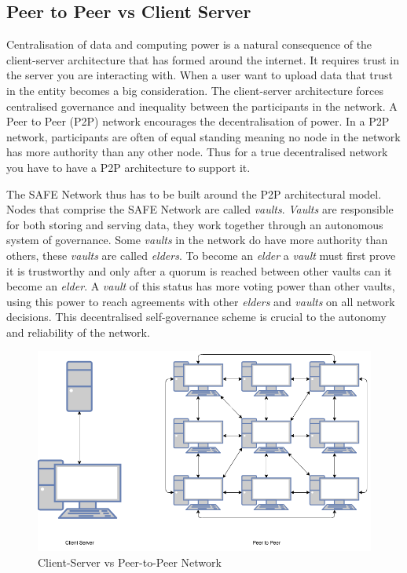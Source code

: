 \subsection{Peer to Peer vs Client Server}

Centralisation of data and computing power is a natural consequence of the client-server architecture that has formed around the internet. It requires trust in the server you are interacting with. When a user want to upload data that trust in the entity becomes a big consideration. The client-server architecture forces centralised governance and inequality between the participants in the network. A Peer to Peer (P2P) network encourages the decentralisation of power. In a P2P network, participants are often of equal standing meaning no node in the network has more authority than any other node. Thus for a true decentralised network you have to have a P2P architecture to support it.

The SAFE Network thus has to be built around the P2P architectural model. Nodes that comprise the SAFE Network are called \textit{vaults}. \textit{Vaults} are responsible for both storing and serving data, they work together through an autonomous system of governance. Some \textit{vaults} in the network do have more authority than others, these \textit{vaults} are called \textit{elders}. To become an \textit{elder} a \textit{vault} must first prove it is trustworthy and only after a quorum is reached between other vaults can it become an \textit{elder}. A \textit{vault} of this status has more voting power than other vaults, using this power to reach agreements with other \textit{elders} and \textit{vaults} on all network decisions. This decentralised self-governance scheme is crucial to the autonomy and reliability of the network.

\begin{figure}
	\begin{center}
		\includegraphics[width=\textwidth]{diagrams/client-server-vs-p2p}
		\caption{Client-Server vs Peer-to-Peer Network}
		\label{fig:client-server-peer2peer}
	\end{center}
\end{figure}


